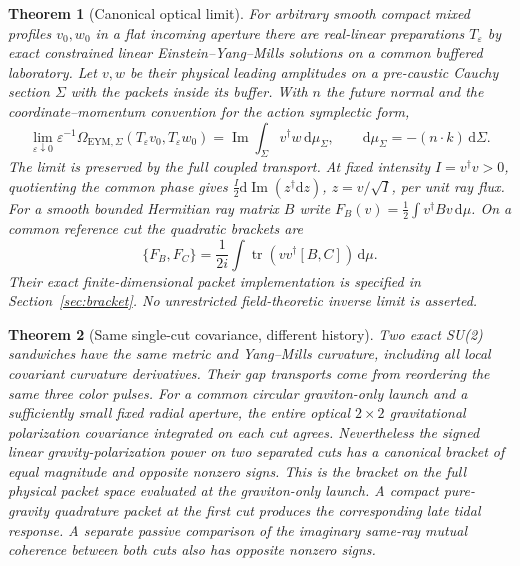 \documentclass[11pt]{article}
\newtheorem{theorem}{Theorem}
\newcommand{\dd}{\mathrm d}
\newcommand{\eps}{\varepsilon}
\newcommand{\im}{\operatorname{Im}}
\newcommand{\tr}{\operatorname{tr}}
\begin{document}
\begin{theorem}[Canonical optical limit]\label{thm:can}
For arbitrary smooth compact mixed profiles \(v_0,w_0\) in a
flat incoming aperture there are real-linear preparations
\(T_\eps\) by exact constrained linear Einstein--Yang--Mills
solutions on a common buffered laboratory. Let \(v,w\) be their
physical leading amplitudes on a pre-caustic Cauchy section
\(\Sigma\) with the packets inside its buffer. With \(n\) the
future normal and the coordinate--momentum convention for
the action symplectic form,
\begin{equation}\label{eq:can}
 \lim_{\eps\downarrow0}\eps^{-1}\Omega_{\mathrm{EYM},\Sigma}
      (T_\eps v_0,T_\eps w_0)
 =\im\int_\Sigma v^\dagger w\,\dd\mu_\Sigma,
 \qquad \dd\mu_\Sigma=-(n\cdot k)\,\dd\Sigma.
\end{equation}
The limit is preserved by the full coupled transport. At fixed
intensity \(I=v^\dagger v>0\), quotienting the common phase gives
\(\tfrac I2\dd\im(z^\dagger\dd z)\), \(z=v/\sqrt I\), per
unit ray flux. For a smooth bounded Hermitian ray matrix \(B\)
write \(F_B(v)=\tfrac12\int v^\dagger Bv\,\dd\mu\). On a common
reference cut the quadratic brackets are
\begin{equation}\label{eq:poisson}
 \{F_B,F_C\}=\frac1{2i}\int\tr(vv^\dagger[B,C])\,\dd\mu.
\end{equation}
Their exact finite-dimensional packet implementation is
specified in Section~\ref{sec:bracket}. No unrestricted
field-theoretic inverse limit is asserted.
\end{theorem}

\begin{theorem}[Same single-cut covariance, different history]\label{thm:benchmark}
Two exact SU(2) sandwiches have the same metric and Yang--Mills
curvature, including all local covariant curvature derivatives.
Their gap transports come from reordering the same three color
pulses. For a common circular graviton-only launch and a
sufficiently small fixed radial aperture, the entire optical
\(2\times2\) gravitational polarization covariance integrated
on each cut agrees. Nevertheless the signed linear
gravity-polarization power on two separated cuts has a
canonical bracket of equal magnitude and opposite nonzero
signs. This is the bracket on the full physical packet space
evaluated at the graviton-only launch. A compact pure-gravity
quadrature packet at the first cut produces the corresponding
late tidal response. A separate passive comparison of the
imaginary same-ray mutual coherence between both cuts also
has opposite nonzero signs.
\end{theorem}
\end{document}
